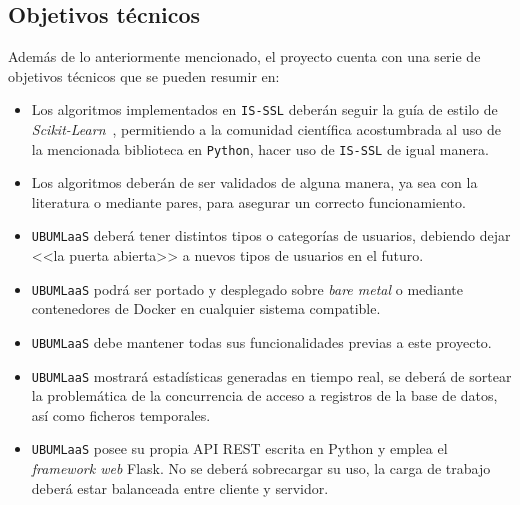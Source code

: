 \subsection{Objetivos técnicos}
Además de lo anteriormente mencionado, el proyecto cuenta con una serie de objetivos técnicos que se pueden resumir en:
\begin{itemize}
\item Los algoritmos implementados en \texttt{IS-SSL} deberán seguir la guía de estilo de \textit{Scikit-Learn}~\cite{SKLEARNGUIDELINES}, permitiendo a la comunidad científica acostumbrada al uso de la mencionada biblioteca en \texttt{Python}, hacer uso de \texttt{IS-SSL} de igual manera.
\item Los algoritmos deberán de ser validados de alguna manera, ya sea con la literatura o mediante pares, para asegurar un correcto funcionamiento. 
\item \texttt{UBUMLaaS} deberá tener distintos tipos o categorías de usuarios, debiendo dejar <<la puerta abierta>> a nuevos tipos de usuarios en el futuro.
\item \texttt{UBUMLaaS} podrá ser portado y desplegado sobre  \textit{bare metal} o mediante contenedores de Docker en cualquier sistema compatible.
\item \texttt{UBUMLaaS} debe mantener todas sus funcionalidades previas a este proyecto.
\item \texttt{UBUMLaaS} mostrará estadísticas generadas en tiempo real, se deberá de sortear la problemática de la concurrencia de acceso a registros de la base de datos, así como ficheros temporales.
\item \texttt{UBUMLaaS} posee su propia API REST escrita en Python y emplea el \textit{framework web} Flask. No se deberá sobrecargar su uso, la carga de trabajo deberá estar balanceada entre cliente y servidor.
\end{itemize}